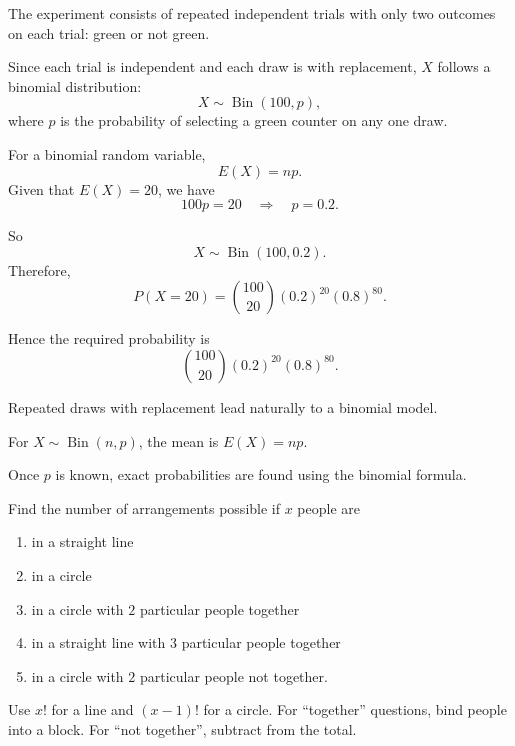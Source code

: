 \begin{hint}
The experiment consists of repeated independent trials with only two outcomes on each trial: green or not green.
\end{hint}

\begin{solution}
Since each trial is independent and each draw is with replacement, $X$ follows a binomial distribution:
\[
X\sim \operatorname{Bin}(100,p),
\]
where $p$ is the probability of selecting a green counter on any one draw.

For a binomial random variable,
\[
E(X)=np.
\]
Given that $E(X)=20$, we have
\[
100p=20 \quad \Rightarrow \quad p=0.2.
\]

So
\[
X\sim \operatorname{Bin}(100,0.2).
\]
Therefore,
\[
P(X=20)=\binom{100}{20}(0.2)^{20}(0.8)^{80}.
\]

Hence the required probability is
\[
\boxed{\binom{100}{20}(0.2)^{20}(0.8)^{80}}.
\]
\end{solution}

\begin{takeaways}
\item Repeated draws with replacement lead naturally to a binomial model.
\item For $X\sim \operatorname{Bin}(n,p)$, the mean is $E(X)=np$.
\item Once $p$ is known, exact probabilities are found using the binomial formula.
\end{takeaways}

\begin{problem}
Find the number of arrangements possible if $x$ people are
\begin{enumerate}[label=\alph*)]
\item in a straight line
\item in a circle
\item in a circle with $2$ particular people together
\item in a straight line with $3$ particular people together
\item in a circle with $2$ particular people not together.
\end{enumerate}
\end{problem}

\begin{hint}
Use $x!$ for a line and $(x-1)!$ for a circle. For ``together'' questions, bind people into a block. For ``not together'', subtract from the total.
\end{hint}

